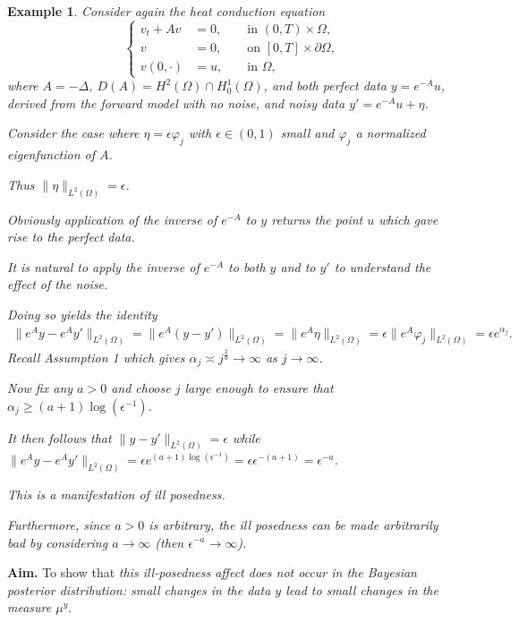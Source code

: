 \documentclass[oneside,11pt]{book}
\numberwithin{equation}{section}
\newtheorem{example}{Example}[section]
\begin{document}
\begin{example}
    Consider again the heat conduction equation
    \begin{equation*}
        \left\{\begin{split}
            v_t + Av &= 0,&&\mbox{ in }(0,T)\times\Omega,\\
            v &= 0,&&\mbox{ on }[0,T]\times\partial\Omega,\\
            v(0,\cdot) &= u,&&\mbox{ in }\Omega,
        \end{split}\right.
    \end{equation*}
    where $A = -\Delta$, $D(A) = H^2(\Omega)\cap H_0^1(\Omega)$, and both perfect data $y = e^{-A}u$, derived from the forward model with no noise, and noisy data $y' = e^{-A}u + \eta$.
    
    Consider the case where $\eta = \epsilon\varphi_j$ with $\epsilon\in(0,1)$ small and $\varphi_j$ a normalized eigenfunction of $A$.
    
    Thus $\|\eta\|_{L^2(\Omega)} = \epsilon$.
    
    Obviously application of the inverse of $e^{-A}$ to $y$ returns the point $u$ which gave rise to the perfect data.
    
    It is natural to apply the inverse of $e^{-A}$ to both $y$ and to $y'$ to understand the effect of the noise.
    
    Doing so yields the identity
    \begin{align*}
        \|e^Ay - e^Ay'\|_{L^2(\Omega)} = \|e^A(y - y')\|_{L^2(\Omega)} = \|e^A\eta\|_{L^2(\Omega)} = \epsilon\|e^A\varphi_j\|_{L^2(\Omega)} = \epsilon e^{\alpha_j}.
    \end{align*}
    Recall Assumption 1 which gives $\alpha_j\asymp j^{\frac{2}{d}}\to\infty$ as $j\to\infty$.
    
    Now fix any $a > 0$ and choose $j$ large enough to ensure that $\alpha_j\ge(a + 1)\log(\epsilon^{-1})$.
    
    It then follows that $\|y - y'\|_{L^2(\Omega)} = \epsilon$ while $\|e^Ay - e^Ay'\|_{L^2(\Omega)} = \epsilon e^{(a + 1)\log(\epsilon^{-1})} = \epsilon\epsilon^{-(a + 1)} = \epsilon^{-a}$.
    
    This is a manifestation of ill posedness.
    
    Furthermore, since $a > 0$ is arbitrary, the ill posedness can be made arbitrarily bad by considering $a\to\infty$ (then $\epsilon^{-a}\to\infty$).
\end{example}
\textbf{Aim.} To show that \textit{this ill-posedness affect does not occur in the Bayesian posterior distribution: small changes in the data $y$ lead to small changes in the measure $\mu^y$}.
\end{document}
